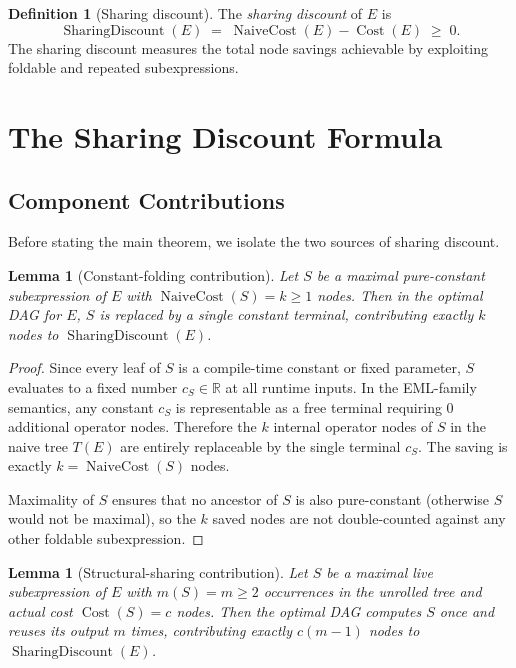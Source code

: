 \documentclass[12pt,a4paper]{article}
\newtheorem{lemma}[theorem]{Lemma}
\theoremstyle{definition}
\newtheorem{definition}[theorem]{Definition}
\newcommand{\Cost}{\operatorname{Cost}}
\newcommand{\NC}{\operatorname{NaiveCost}}
\newcommand{\SD}{\operatorname{SharingDiscount}}
\begin{document}
\begin{definition}[Sharing discount]
\label{def:SD}
The \emph{sharing discount} of $E$ is
\[
  \SD(E) \;=\; \NC(E) - \Cost(E) \;\geq\; 0.
\]
The sharing discount measures the total node savings achievable by
exploiting foldable and repeated subexpressions.
\end{definition}

\section{The Sharing Discount Formula}
\label{sec:formula}

\subsection{Component Contributions}

Before stating the main theorem, we isolate the two sources of sharing
discount.

\begin{lemma}[Constant-folding contribution]
\label{lem:cfold}
Let $S$ be a maximal pure-constant subexpression of $E$ with
$\NC(S) = k \geq 1$ nodes.  Then in the optimal DAG for $E$, $S$ is
replaced by a single constant terminal, contributing exactly $k$ nodes
to $\SD(E)$.
\end{lemma}

\begin{proof}
Since every leaf of $S$ is a compile-time constant or fixed parameter,
$S$ evaluates to a fixed number $c_S \in \mathbb{R}$ at all runtime inputs.
In the EML-family semantics, any constant $c_S$ is representable as a free
terminal requiring 0 additional operator nodes.  Therefore the $k$ internal
operator nodes of $S$ in the naive tree $T(E)$ are entirely replaceable by
the single terminal $c_S$.  The saving is exactly $k = \NC(S)$ nodes.

Maximality of $S$ ensures that no ancestor of $S$ is also pure-constant
(otherwise $S$ would not be maximal), so the $k$ saved nodes are not
double-counted against any other foldable subexpression.
\end{proof}

\begin{lemma}[Structural-sharing contribution]
\label{lem:struct}
Let $S$ be a maximal live subexpression of $E$ with $m(S) = m \geq 2$
occurrences in the unrolled tree and actual cost $\Cost(S) = c$ nodes.
Then the optimal DAG computes $S$ once and reuses its output $m$ times,
contributing exactly $c(m-1)$ nodes to $\SD(E)$.
\end{lemma}
\end{document}
